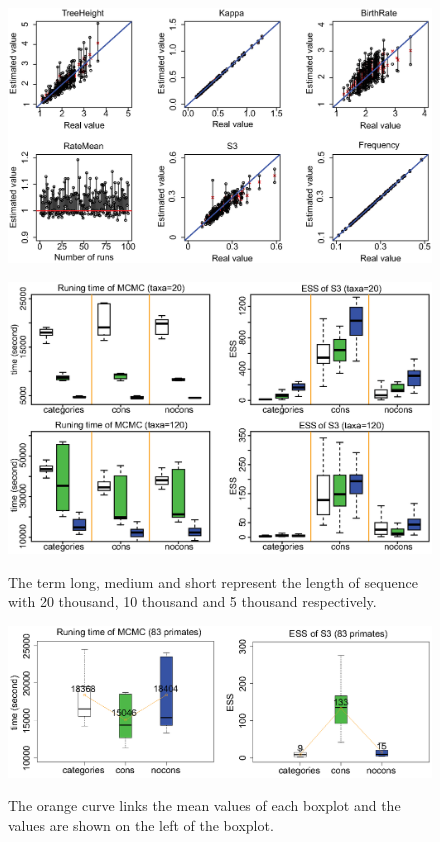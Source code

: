 \documentclass{bmcart}
\begin{document}
\begin{backmatter}
\begin{figure}[h!]
\includegraphics[width=12cm]{Fig13-largetree.eps}\\
\caption{
             }
\label{LargeTree}
\end{figure}

\begin{figure}[h!]
\includegraphics[width=12cm]{Fig14-efficiency.eps}\\
\caption{
             The term long, medium and short represent the length of sequence with 20 thousand, 10 thousand and 5 thousand respectively.}
\label{eff_comp}
\end{figure}

\begin{figure}[h!]
\includegraphics[width=12cm]{Fig15-primates.eps}\\
\caption{
             The orange curve links the mean values of each boxplot and the values are shown on the left of the boxplot.}
\label{eff_comp2}
\end{figure}


\end{backmatter}
\end{document}
